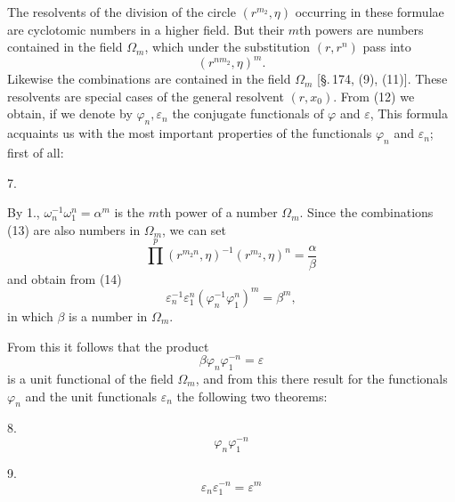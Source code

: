 
The resolvents of the division of the circle $(r^{m_2}, \eta)$
occurring in these formulae are cyclotomic numbers in a higher
field. But their $m$th powers are numbers contained in the field
$\Omega_m$, which under the substitution $(r, r^n)$ pass into
\[
(r^{n m_2}, \eta)^m.
\]
Likewise the combinations
are contained in the field $\Omega_m$ [\S.\,174, (9), (11)]. These
resolvents are special cases of the general resolvent
$(r, x_0)$. From (12) we obtain, if we denote by $\varphi_n,
\varepsilon_n$ the conjugate functionals of $\varphi$ and
$\varepsilon$,
This formula acquaints us with the most important properties of the
functionals $\varphi_n$ and $\varepsilon_n$; first of all:

7. 

By 1., $\omega_n^{-1} \omega_1^n = \alpha^m$ is the %
$m$th power of a number $\Omega_m$. Since the
combinations (13) are also numbers in $\Omega_m$, we can set
\[
\prod^{p} (r^{m_2 n}, \eta)^{-1} (r^{m_2}, \eta)^n = \frac{\alpha}{\beta}
\]
and obtain from (14)
\[
\varepsilon_n^{-1} \varepsilon_1^n (\varphi_n^{-1} \varphi_1^n)^m = \beta^m,
\]
in which $\beta$ is a number in $\Omega_m$.

From this it follows that the product
\[
\beta \varphi_n \varphi_1^{-n} = \varepsilon
\]
is a unit functional of the field $\Omega_m$, and from this there
result for the functionals $\varphi_n$ and the
unit functionals $\varepsilon_n$ the following two theorems:

8. 
\[
\varphi_n \varphi_1^{-n}
\]

9. 
\[
\varepsilon_n \varepsilon_1^{-n} = \varepsilon^m
\]

